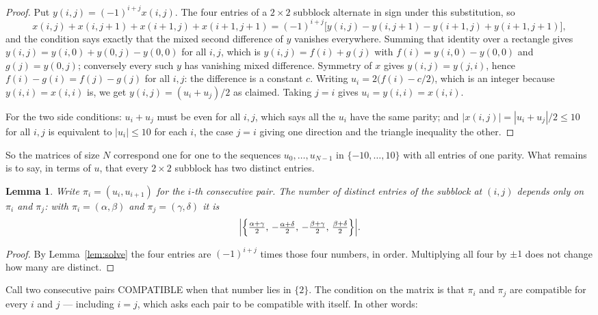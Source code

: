 \documentclass[11pt,a4paper]{article}
\theoremstyle{plain}
\newtheorem{lemma}[theorem]{Lemma}
\theoremstyle{definition}
\begin{document}
\begin{proof}
Put $y(i,j)=(-1)^{i+j}x(i,j)$. The four entries of a $2\times2$ subblock alternate in sign
under this substitution, so
\[
x(i,j)+x(i,j{+}1)+x(i{+}1,j)+x(i{+}1,j{+}1)
=(-1)^{i+j}\bigl[y(i,j)-y(i,j{+}1)-y(i{+}1,j)+y(i{+}1,j{+}1)\bigr],
\]
and the condition says exactly that the mixed second difference of $y$ vanishes everywhere.
Summing that identity over a rectangle gives
$y(i,j)=y(i,0)+y(0,j)-y(0,0)$ for all $i,j$, which is $y(i,j)=f(i)+g(j)$ with
$f(i)=y(i,0)-y(0,0)$ and $g(j)=y(0,j)$; conversely every such $y$ has vanishing mixed
difference. Symmetry of $x$ gives $y(i,j)=y(j,i)$, hence $f(i)-g(i)=f(j)-g(j)$ for all $i,j$:
the difference is a constant $c$. Writing $u_i=2\bigl(f(i)-c/2\bigr)$, which is an integer
because $y(i,i)=x(i,i)$ is, we get $y(i,j)=(u_i+u_j)/2$ as claimed. Taking $j=i$ gives
$u_i=y(i,i)=x(i,i)$.

For the two side conditions: $u_i+u_j$ must be even for all $i,j$, which says all the $u_i$ have
the same parity; and $|x(i,j)|=|u_i+u_j|/2\le10$ for all $i,j$ is equivalent to $|u_i|\le10$
for each $i$, the case $j=i$ giving one direction and the triangle inequality the other.
\end{proof}

So the matrices of size $N$ correspond one for one to the sequences $u_0,\dots,u_{N-1}$ in
$\{-10,\dots,10\}$ with all entries of one parity. What remains is to say, in terms of $u$,
that every $2\times2$ subblock has two distinct entries.

\begin{lemma}\label{lem:block}
Write $\pi_i=(u_i,u_{i+1})$ for the $i$-th consecutive pair. The number of distinct entries of
the subblock at $(i,j)$ depends only on $\pi_i$ and $\pi_j$: with $\pi_i=(\alpha,\beta)$ and
$\pi_j=(\gamma,\delta)$ it is
\[
\Bigl|\Bigl\{\tfrac{\alpha+\gamma}{2},\,-\tfrac{\alpha+\delta}{2},\,
-\tfrac{\beta+\gamma}{2},\,\tfrac{\beta+\delta}{2}\Bigr\}\Bigr| .
\]
\end{lemma}

\begin{proof}
By Lemma~\ref{lem:solve} the four entries are $(-1)^{i+j}$ times those four numbers, in
order. Multiplying all four by $\pm1$ does not change how many are distinct.
\end{proof}

Call two consecutive pairs COMPATIBLE when that number lies in $\{2\}$. The condition on the
matrix is that $\pi_i$ and $\pi_j$ are compatible for every $i$ and $j$ --- including $i=j$,
which asks each pair to be compatible with itself. In other words:
\end{document}
